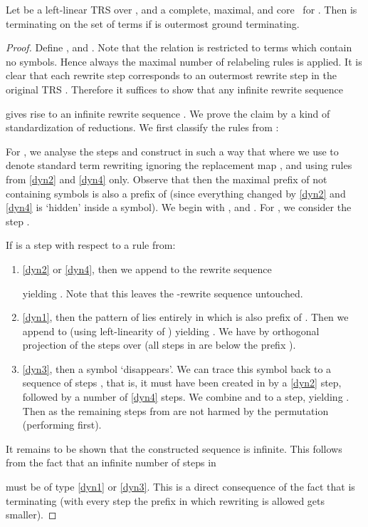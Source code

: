 \begin{theorem}\label{thm:dynlab:complete}
  Let  be a left-linear TRS over , 
  and  a complete, maximal, and core \clabeling\ for .
  Then  is terminating on the set of terms 
  if  is outermost ground terminating.
\end{theorem}
\begin{proof}
  \newcommand{\sto}{\hookrightarrow}\newcommand{\nto}{\stackrel{\makebox(0,0){{\scriptsize}}}{\longrightarrow}}Define ,
  and .
  Note that the relation  is restricted to terms which contain no  symbols.
  Hence always the maximal number of relabeling rules is applied.
  It is clear that each  rewrite step corresponds to an outermost rewrite step in the original TRS .
  Therefore it suffices to show that any infinite rewrite sequence
  
  gives rise to an infinite rewrite sequence .
  We prove the claim by a kind of standardization of reductions.
We first classify the rules from :
  
For , we analyse the steps 
  and construct 
  in such a way that 
  where we use  to denote standard term rewriting 
  ignoring the replacement map , and using rules from \eqref{dyn2} and \eqref{dyn4} only.
  Observe that then the maximal prefix  of  
  not containing  symbols is also a prefix of 
  (since everything changed by \eqref{dyn2} and \eqref{dyn4} is `hidden' inside a  symbol).
  We begin with , and .
  For , we consider the step .

  If  is a step with respect to a rule from:
  \begin{enumerate}[]

  \item
\eqref{dyn2} or \eqref{dyn4}, then
  we append  to the rewrite sequence 
  
  yielding 
  .
  Note that this leaves the -rewrite sequence  untouched.

  \item
\eqref{dyn1},
  then the pattern of  lies entirely in  which is also prefix of .
  Then we append  to  (using left-linearity of ) 
  yielding .
  We have 
  by orthogonal projection of the steps 
  over  (all steps in  are below the prefix ).
  
  \item
\eqref{dyn3}, then a  symbol `disappears'.
  We can trace this symbol back to a sequence of steps
  ,
  that is, it must have been created in  by a \eqref{dyn2} step,
  followed by a number of \eqref{dyn4} steps.
  We combine  and  to a  step,
  yielding .
  Then 
  as the remaining steps from
   are not harmed by the permutation (performing  first).

  \end{enumerate}

  \noindent
  It remains to be shown that the constructed sequence  is infinite.
  This follows from the fact that an infinite number of steps in
  
  must be of type \eqref{dyn1} or \eqref{dyn3}.
  This is a direct consequence of the fact that
   is terminating
  (with every step the prefix in which rewriting is allowed gets smaller).
\end{proof}


